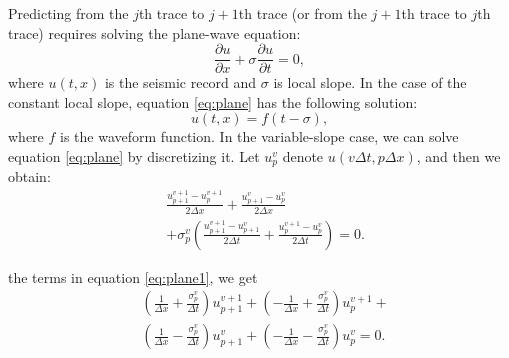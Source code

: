 Predicting from the $j$th trace to $j+1$th trace (or from the $j+1$th trace to $j$th trace) requires solving the plane-wave equation:
\begin{equation}
\label{eq:plane}
\frac{\partial u}{\partial x} + \sigma \frac{\partial u}{\partial t} = 0,
\end{equation}
where $u(t,x)$ is the seismic record and $\sigma$ is local slope.  In the case of the constant local slope, equation \ref{eq:plane} has the following solution:
\begin{equation}
\label{eq:planesolu}
u(t,x) = f(t-\sigma),
\end{equation}
where $f$ is the waveform function. In the variable-slope case, we can solve equation \ref{eq:plane} by discretizing it. Let $u_p^v$ denote $u(v\Delta t,p\Delta x)$, and then we obtain:
\begin{equation}
\label{eq:plane1}
\begin{split}
&\frac{u_{p+1}^{v+1} - u_p^{v+1}}{2\Delta x} + \frac{u_{p+1}^{v} - u_p^{v}}{2\Delta x}\\
&+\sigma^v_p \left(\frac{u_{p+1}^{v+1}-u_{p+1}^v}{2\Delta t}+
\frac{u_{p}^{v+1}-u_{p}^v}{2\Delta t}\right) = 0.
\end{split}
\end{equation}


 the terms in equation \ref{eq:plane1}, we get
\begin{equation}
\label{eq:plane2}
\begin{split}
&\left(\frac{1}{\Delta x}+\frac{\sigma_p^v}{\Delta t}\right) u_{p+1}^{v+1} + 
\left(-\frac{1}{\Delta x}+\frac{\sigma_p^v}{\Delta t}\right)u_{p}^{v+1} +\\
&\left(\frac{1}{\Delta x}-\frac{\sigma_p^v}{\Delta t}\right)u_{p+1}^{v}+
\left(-\frac{1}{\Delta x}-\frac{\sigma_p^v}{\Delta t}\right)u_{p}^{v}=0.
\end{split}
\end{equation}

